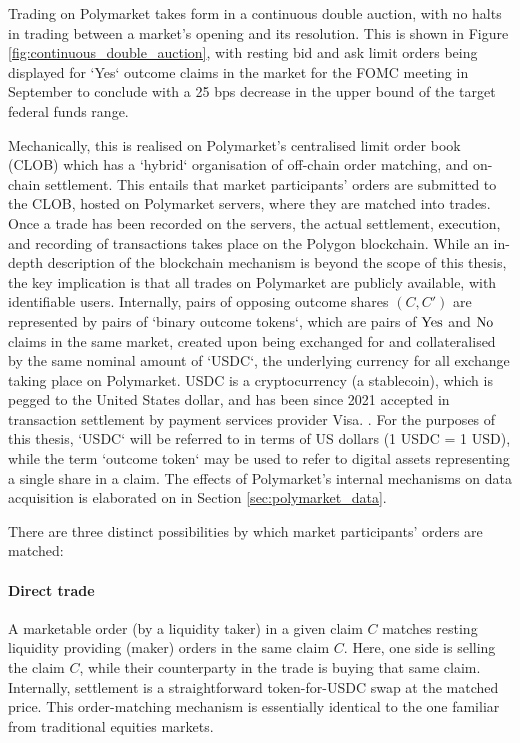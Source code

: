 Trading on Polymarket takes form in a continuous double auction, with no halts in trading between a market's opening and its resolution.
This is shown in Figure \ref{fig:continuous_double_auction}, with resting bid and ask limit orders being displayed for `Yes` outcome claims in the market for the FOMC meeting in September to conclude with a 25 bps decrease in the upper bound of the target federal funds range.

Mechanically, this is realised on Polymarket's centralised limit order book (CLOB) which has a `hybrid` organisation of off-chain order matching, and on-chain settlement.
This entails that market participants' orders are submitted to the CLOB, hosted on Polymarket servers, where they are matched into trades. Once a trade has been recorded on the servers, the actual settlement, execution, and recording of transactions takes place on the Polygon blockchain.
While an in-depth description of the blockchain mechanism is beyond the scope of this thesis, the key implication is that all trades on Polymarket are publicly available, with identifiable users.
Internally, pairs of opposing outcome shares $(C, C')$ are represented by pairs of `binary outcome tokens`, which are pairs of $\text{Yes}$ and $\text{No}$ claims in the same market, created upon being exchanged for and collateralised by the same nominal amount of `USDC`, the underlying currency for all exchange taking place on Polymarket.
USDC is a cryptocurrency (a stablecoin), which is pegged to the United States dollar, and has been since 2021 accepted in transaction settlement by payment services provider Visa. \citep{hussain_visa_2021}.
For the purposes of this thesis, `USDC` will be referred to in terms of US dollars (1 USDC = 1 USD), while the term `outcome token` may be used to refer to digital assets representing a single share in a claim.
The effects of Polymarket's internal mechanisms on data acquisition is elaborated on in Section \ref{sec:polymarket_data}.

There are three distinct possibilities by which market participants' orders are matched:

\paragraph{Direct trade} A marketable order (by a liquidity taker) in a given claim $C$ matches resting liquidity providing (maker) orders in the same claim $C$. Here, one side is selling the claim $C$, while their counterparty in the trade is buying that same claim.
Internally, settlement is a straightforward token-for-USDC swap at the matched price.
This order-matching mechanism is essentially identical to the one familiar from traditional equities markets.


